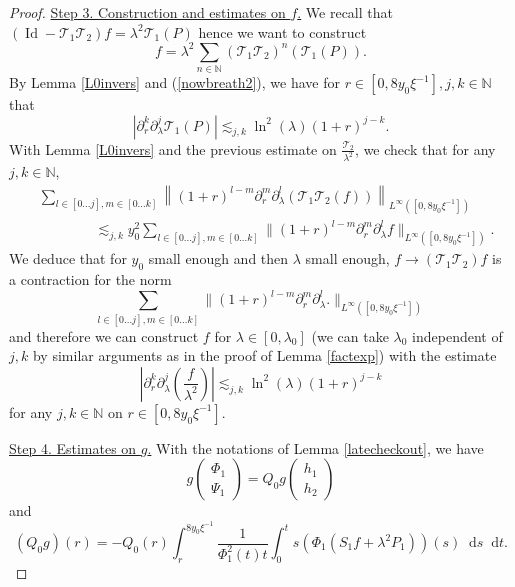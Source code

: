\documentclass[11 pt]{amsart}
\newcommand{\tmop}[1]{\ensuremath{\operatorname{#1}}}
\theoremstyle{definition}
\theoremstyle{remark}
\numberwithin{equation}{section}
\newcommand{\dd}{\mathop{}\!\mathrm{d}}
\begin{document}
\begin{proof}
\medskip
\noindent \underline{Step 3. Construction and estimates on $f$.} 
  We recall that $(\tmop{Id} -\mathcal{T}_1 \mathcal{T}_2) f = \lambda^2
  \mathcal{T}_1 (P)$ hence we want to construct
  \[ f = \lambda^2 \sum_{n \in \mathbb{N}}  \left( \mathcal{T}_1
     \mathcal{T}_2 \right)^n (\mathcal{T}_1 (P)) . \]
  By Lemma \ref{L0invers} and (\ref{nowbreath2}), we have for $r \in [0, 8 y_0
  \xi^{- 1}], j, k \in \mathbb{N}$ that
  \[ | \partial_r^k \partial_{\lambda}^j \mathcal{T}_1 (P) | \lesssim_{j, k}
     \ln^2 (\lambda) (1 + r)^{j - k} . \]
  With Lemma \ref{L0invers} and the previous estimate on
  $\frac{\mathcal{T}_2}{\lambda^2}$, we check that for any $j, k \in
  \mathbb{N}$,
  \begin{align*}
    &  \sum_{l \in [0 \ldots j], m \in [0 \ldots k]} \left\| (1 + r)^{l -
    m} \partial_r^m \partial_{\lambda}^l \left( \mathcal{T}_1
    \mathcal{T}_2 (f) \right) \right\|_{L^{\infty} ([0, 8 y_0
    \xi^{- 1}])}\\
    & \qquad \qquad \lesssim_{j, k}  y_0^2 \sum_{l \in [0 \ldots j], m \in [0
    \ldots k]} \| (1 + r)^{l - m} \partial_r^m \partial_{\lambda}^l f
    \|_{L^{\infty} ([0, 8 y_0 \xi^{- 1}])} .
  \end{align*}
  We deduce that for $y_0$ small enough and then $\lambda$ small enough, $f \rightarrow  \left(
  \mathcal{T}_1 \mathcal{T}_2\right) f$ is a contraction
  for the norm
  \[ \sum_{l \in [0 \ldots j], m \in [0 \ldots k]} \| (1 + r)^{l - m}
     \partial_r^m \partial_{\lambda}^l . \|_{L^{\infty} ([0, 8 y_0 \xi^{- 1}])} \]
  and therefore we can construct $f$ for $\lambda \in [0, \lambda_0]$ (we can
  take $\lambda_0$ independent of $j, k$ by similar arguments as in the proof
  of Lemma \ref{factexp}) with the estimate
  \[ \left| \partial_r^k \partial_{\lambda}^j \left( \frac{f}{\lambda^2 } \right) \right| \lesssim_{j, k} \ln^2
     (\lambda) (1 + r)^{j - k} \]
  for any $j, k \in \mathbb{N}$ on $r \in [0, 8 y_0\xi^{- 1}]$.

\medskip
\noindent \underline{Step 4. Estimates on $g$.}
  With the notations of Lemma \ref{latecheckout}, we have
  \[ g \left(\begin{array}{c}
       \Phi_1\\
       \Psi_1
     \end{array}\right) = Q_0 g \left(\begin{array}{c}
       h_1\\
       h_2
     \end{array}\right) \]
  and
  \[ (Q_0 g) (r) = - Q_0 (r) \int_r^{8 y_0 \xi^{- 1}} \frac{1}{\Phi_1^2 (t) t}
     \int_0^t s (\Phi_1 (S_1 f + \lambda^2 P_1)) (s) \dd s \dd t. \]


\end{proof}
\end{document}
